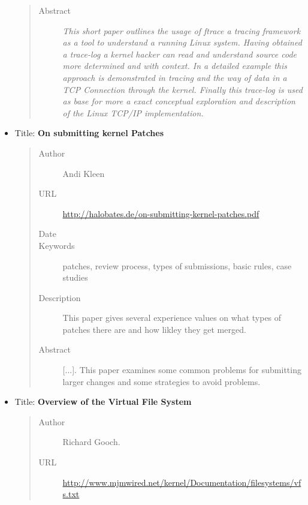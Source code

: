 \documentclass[a4paper,8pt,english]{sphinxmanual}
\begin{document}
\begin{itemize}
\begin{quote}
\begin{description}
\item[{Abstract}] \leavevmode
\emph{This short paper outlines the usage of ftrace a tracing framework
as a tool to understand a running Linux system.
Having obtained a trace-log a kernel hacker can read and understand
source code more determined and with context.
In a detailed example this approach is demonstrated in tracing
and the way of data in a TCP Connection through the kernel.
Finally this trace-log is used as base for more a exact conceptual
exploration and description of the Linux TCP/IP implementation.}

\end{description}\end{quote}

\item {} 
Title: \textbf{On submitting kernel Patches}
\begin{quote}\begin{description}
\item[{Author}] \leavevmode
Andi Kleen

\item[{URL}] \leavevmode
\href{http://halobates.de/on-submitting-kernel-patches.pdf}{http://halobates.de/on-submitting-kernel-patches.pdf}

\item[{Date}] 

\item[{Keywords}] \leavevmode
patches, review process, types of submissions, basic rules, case studies

\item[{Description}] \leavevmode
This paper gives several experience values on what types of patches
there are and how likley they get merged.

\item[{Abstract}] \leavevmode
{[}...{]}. This paper examines some common problems for
submitting larger changes and some strategies to avoid problems.

\end{description}\end{quote}

\item {} 
Title: \textbf{Overview of the Virtual File System}
\begin{quote}\begin{description}
\item[{Author}] \leavevmode
Richard Gooch.

\item[{URL}] \leavevmode
\href{http://www.mjmwired.net/kernel/Documentation/filesystems/vfs.txt}{http://www.mjmwired.net/kernel/Documentation/filesystems/vfs.txt}


\end{description}
\end{quote}
\end{itemize}
\end{document}
